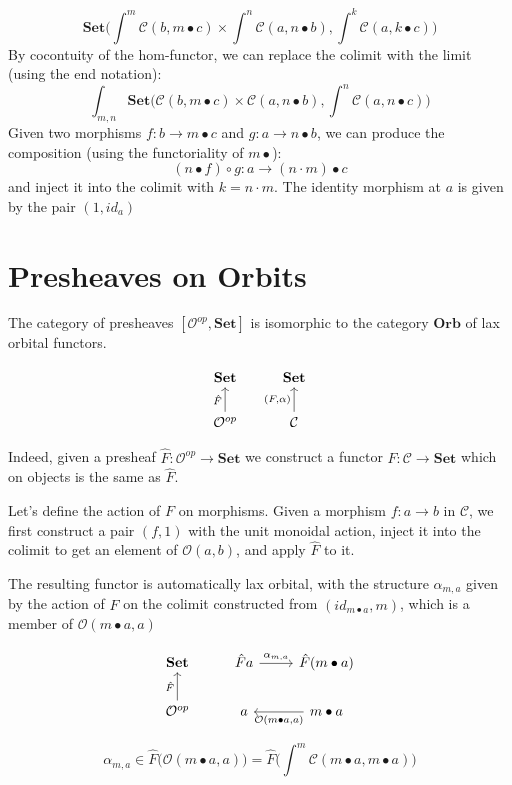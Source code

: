 \documentclass[11pt]{amsart}
\newcommand{\cat}[1]{\mathcal{#1}}%
\newcommand{\Cat}[1]{\mathbf{#1}}%
\newcommand{\Set}{\Cat{Set}}
\begin{document}
\[ \Set \big(\int^m \cat C(b, m \bullet c) \times \int^{n} \cat C(a, n \bullet b) , \int^k \cat C(a, k \bullet c) \big) \]
By cocontuity of the hom-functor, we can replace the colimit with the limit (using the end notation):
\[\int_{m,n}  \Set \big(\cat C(b, m \bullet c) \times \cat C(a, n \bullet b) , \int^n \cat C(a, n \bullet c) \big) \]
Given two morphisms $f \colon b \to m \bullet c $ and $g \colon a \to n \bullet b$, we can produce the composition (using the functoriality of $m \bullet$):
\[ (n \bullet f ) \circ g \colon a \to (n \cdot m) \bullet c \]
and inject it into the colimit with $k = n \cdot m$.
The identity morphism at $a$ is given by the pair $(1, id_a)$

\section{Presheaves on Orbits}

The category of presheaves $[ \cat O^{op}, \Set]$ is isomorphic to the category $\mathbf {Orb}$ of lax orbital functors. 


\[
\begin{tikzcd}
\Set
& \Set
\\ \cat O^{op}
\arrow[u, "\hat F"]
& \cat C
\arrow[u, "{(F, \alpha)}"]
\end{tikzcd}
\]

Indeed, given a presheaf $\hat F: \cat O^{op} \to \Set$ we construct a functor $F \colon \cat C \to \Set$ which on objects is the same as $\hat F$. 

Let's define the action of $F$ on morphisms. Given a morphism $f \colon a \to b$ in $\cat C$, we first construct a pair $(f, 1)$ with the unit monoidal action, inject it into the colimit to get an element of $\cat O (a, b)$, and apply $\hat F$ to it.

The resulting functor is automatically lax orbital, with the structure $\alpha_{m, a}$ given by the action of $\hat F$ on the colimit constructed from $(id_{m \bullet a}, m)$, which is a member of $\cat O(m \bullet a, a)$ 

\[
\begin{tikzcd}
\Set
& \hat F a
\arrow[r, "{\alpha_{m, a}}"]
& \hat F (m \bullet a)
\\ \cat O^{op}
\arrow[u, "\hat F"]
& a
& m \bullet a
\arrow[l, "{\cat O(m \bullet a, a)}"]
\end{tikzcd}
\]


\[ \alpha_{m, a} \in \hat F \big(\cat O (m \bullet a, a)\big) = \hat F\big(\int^m \cat C (m \bullet a, m \bullet a) \big)\]
\end{document}
